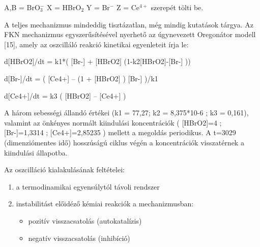 A,B = BrO$_3^-$
X = HBrO$_2$
Y = Br$^-$
Z = Ce$^{4+}$ szerepét tölti be.

A teljes mechanizmus mindeddig tisztázatlan, még mindig kutatások tárgya. Az FKN mechanizmus egyszerűsítésével nyerhető az úgynevezett Oregonátor modell [15], amely az oszcilláló reakció kinetikai egyenleteit írja le:

\begin{center}
d[HBrO2]/dt = k1*( [Br-] + [HBrO2] (1-k2[HBrO2]-[Br-] ))

d[Br-]/dt = ( [Ce4+] – (1 + [HBrO2] ) [Br-] )/k1

d[Ce4+]/dt = k3 ( [HBrO2] – [Ce4+] )
\end{center}

A három sebességi állandó értékei (k1 = 77,27;    k2 = 8,375*10-6 ; k3 = 0,161), valamint az önkényes normált kiindulási koncentrációk ( [HBrO2]=4 ; [Br-]=1,3314 ; [Ce4+]=2,85235 ) mellett a megoldás periodikus. A t=3029 (dimenziómentes idő) hosszúságú ciklus végén a koncentrációk visszatérnek a kiindulási állapotba.


%
%
%
%
%

Az oszcilláció kialakulásának feltételei:
\begin{enumerate}
\item a termodinamikai egyensúlytól távoli rendszer
\item instabilitást előidéző kémiai reakciók a mechanizmusban:
 \begin{itemize}
\item pozitív visszacsatolás (autokatalízis)
\item negatív visszacsatolás (inhibíció)
\end{itemize}
\end{enumerate}

